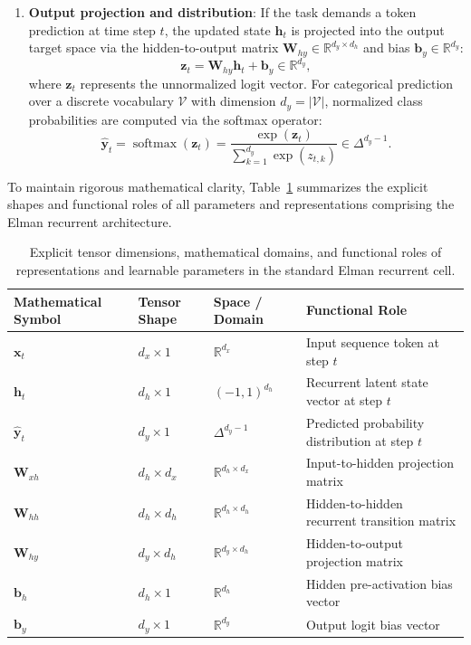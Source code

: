 \documentclass[../../main.tex]{subfiles}
\begin{document}
\begin{enumerate}
    \item \textbf{Output projection and distribution}: If the task demands a token prediction at time step $t$, the updated state $\mathbf{h}_t$ is projected into the output target space via the hidden-to-output matrix $\mathbf{W}_{hy} \in \mathbb{R}^{d_y \times d_h}$ and bias $\mathbf{b}_y \in \mathbb{R}^{d_y}$:
    \begin{equation}
    \mathbf{z}_t = \mathbf{W}_{hy} \mathbf{h}_t + \mathbf{b}_y \in \mathbb{R}^{d_y},
    \label{eq:rnn_logits}
    \end{equation}
    where $\mathbf{z}_t$ represents the unnormalized logit vector. For categorical prediction over a discrete vocabulary $\mathcal{V}$ with dimension $d_y = |\mathcal{V}|$, normalized class probabilities are computed via the softmax operator:
    \begin{equation}
    \hat{\mathbf{y}}_t = \operatorname{softmax}\left(\mathbf{z}_t\right) = \frac{\exp\left(\mathbf{z}_t\right)}{\sum_{k=1}^{d_y} \exp\left(z_{t, k}\right)} \in \Delta^{d_y - 1}.
    \label{eq:rnn_softmax_output}
    \end{equation}
\end{enumerate}

To maintain rigorous mathematical clarity, Table~\ref{tab:rnn_tensor_dimensions} summarizes the explicit shapes and functional roles of all parameters and representations comprising the Elman recurrent architecture.

\begin{table}[htbp]
\centering
\small
\begin{tabularx}{\textwidth}{l l l X}
\toprule
\textbf{Mathematical Symbol} & \textbf{Tensor Shape} & \textbf{Space / Domain} & \textbf{Functional Role} \\
\midrule
$\mathbf{x}_t$ & $d_x \times 1$ & $\mathbb{R}^{d_x}$ & Input sequence token at step $t$ \\
$\mathbf{h}_t$ & $d_h \times 1$ & $(-1, 1)^{d_h}$ & Recurrent latent state vector at step $t$ \\
$\hat{\mathbf{y}}_t$ & $d_y \times 1$ & $\Delta^{d_y-1}$ & Predicted probability distribution at step $t$ \\
$\mathbf{W}_{xh}$ & $d_h \times d_x$ & $\mathbb{R}^{d_h \times d_x}$ & Input-to-hidden projection matrix \\
$\mathbf{W}_{hh}$ & $d_h \times d_h$ & $\mathbb{R}^{d_h \times d_h}$ & Hidden-to-hidden recurrent transition matrix \\
$\mathbf{W}_{hy}$ & $d_y \times d_h$ & $\mathbb{R}^{d_y \times d_h}$ & Hidden-to-output projection matrix \\
$\mathbf{b}_h$ & $d_h \times 1$ & $\mathbb{R}^{d_h}$ & Hidden pre-activation bias vector \\
$\mathbf{b}_y$ & $d_y \times 1$ & $\mathbb{R}^{d_y}$ & Output logit bias vector \\
\bottomrule
\end{tabularx}
\caption{Explicit tensor dimensions, mathematical domains, and functional roles of representations and learnable parameters in the standard Elman recurrent cell.}
\label{tab:rnn_tensor_dimensions}
\end{table}
\end{document}

